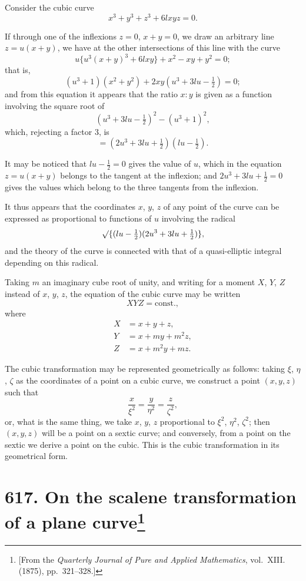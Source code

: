 \documentclass[11pt,a4paper]{book}
\begin{document}
Consider the cubic curve
\[
x^3 + y^3 + z^3 + 6lxyz = 0.
\]

If through one of the inflexions $z = 0$, $x + y = 0$, we draw an arbitrary line $z = u(x+y)$, we have at the other intersections of this line with the curve
\[
u\{u^3(x+y)^3 + 6lxy\} + x^2 - xy + y^2 = 0;
\]
that is,
\[
(u^3+1)(x^2+y^2) + 2xy(u^3 + 3lu - \tfrac{1}{2}) = 0;
\]
and from this equation it appears that the ratio $x:y$ is given as a function involving the square root of
\[
(u^3 + 3lu - \tfrac{1}{2})^2 - (u^3+1)^2,
\]
which, rejecting a factor 3, is
\[
= (2u^3 + 3lu + \tfrac{1}{2})(lu - \tfrac{1}{2}).
\]

It may be noticed that $lu - \tfrac{1}{2} = 0$ gives the value of $u$, which in the equation $z = u(x+y)$ belongs to the tangent at the inflexion; and $2u^3 + 3lu + \tfrac{1}{2} = 0$ gives the values which belong to the three tangents from the inflexion.

It thus appears that the coordinates $x$, $y$, $z$ of any point of the curve can be expressed as proportional to functions of $u$ involving the radical
\[
\surd\{(lu - \tfrac{1}{2})(2u^3 + 3lu + \tfrac{1}{2})\},
\]
and the theory of the curve is connected with that of a quasi-elliptic integral depending on this radical.

Taking $m$ an imaginary cube root of unity, and writing for a moment $X$, $Y$, $Z$ instead of $x$, $y$, $z$, the equation of the cubic curve may be written
\[
XYZ = \text{const.},
\]
where
\begin{align*}
X &= x + y + z,\\
Y &= x + my + m^2z,\\
Z &= x + m^2y + mz.
\end{align*}

The cubic transformation may be represented geometrically as follows: taking $\xi$, $\eta$, $\zeta$ as the coordinates of a point on a cubic curve, we construct a point $(x, y, z)$ such that
\[
\frac{x}{\xi^2} = \frac{y}{\eta^2} = \frac{z}{\zeta^2},
\]
or, what is the same thing, we take $x$, $y$, $z$ proportional to $\xi^2$, $\eta^2$, $\zeta^2$; then $(x, y, z)$ will be a point on a sextic curve; and conversely, from a point on the sextic we derive a point on the cubic. This is the cubic transformation in its geometrical form.

\newpage
\section[On the scalene transformation of a plane curve]{\textbf{617.} On the scalene transformation of a plane curve\footnote{[From the \textit{Quarterly Journal of Pure and Applied Mathematics}, vol.~XIII. (1875), pp.~321--328.]}}
\end{document}
